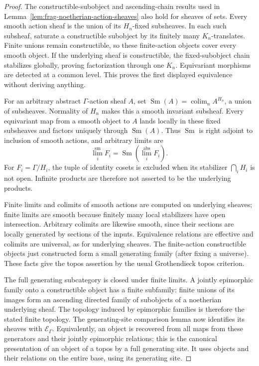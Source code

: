 \documentclass[11pt]{article}
\theoremstyle{definition}
\theoremstyle{remark}
\begin{document}
\begin{proof}
The constructible-subobject and ascending-chain results used in
Lemma~\ref{lem:frag-noetherian-action-sheaves} also hold for sheaves
of sets.  Every smooth action sheaf is the union of its $H_n$-fixed
subsheaves.  In each such subsheaf, saturate a constructible subobject
by its finitely many $K_n$-translates.  Finite unions remain
constructible, so these finite-action objects cover every smooth
object.  If the underlying sheaf is constructible, the fixed-subobject
chain stabilizes globally, proving factorization through one $K_n$.
Equivariant morphisms are detected at a common level.  This proves
the first displayed equivalence without deriving anything.

For an arbitrary abstract $\Gamma$-action sheaf $A$, set
$\operatorname{Sm}(A)=\operatorname*{colim}_n A^{H_n}$, a union of
subsheaves.  Normality of $H_n$ makes this a smooth invariant subsheaf.
Every equivariant map from a smooth object to $A$ lands locally in
these fixed subsheaves and factors uniquely through $\operatorname{Sm}(A)$.
Thus $\operatorname{Sm}$ is right adjoint to inclusion of smooth actions,
and arbitrary limits are
\[
 \lim_i^{\mathrm{sm}}F_i=\operatorname{Sm}(\lim_i^{\mathrm{abs}}F_i).
\]
For $F_i=\Gamma/H_i$, the tuple of identity cosets is excluded when
its stabilizer $\bigcap_iH_i$ is not open.  Infinite products are
therefore not asserted to be the underlying products.

Finite limits and colimits of smooth actions are computed on underlying
sheaves; finite limits are smooth because finitely many local
stabilizers have open intersection.  Arbitrary colimits are likewise
smooth, since their sections are locally generated by sections of the
inputs.  Equivalence relations are effective and colimits are
universal, as for underlying sheaves.  The finite-action constructible
objects just constructed form a small generating family (after fixing
a universe).  These facts give the topos assertion by the usual
Grothendieck topos criterion.

The full generating subcategory is closed under finite limits.  A
jointly epimorphic family onto a constructible object has a finite
subfamily: finite unions of its images form an ascending directed
family of subobjects of a noetherian underlying sheaf.  The topology
induced by epimorphic families is therefore the stated finite topology.
The generating-site comparison lemma now identifies its sheaves with
$\mathscr E_\Gamma$.  Equivalently, an object is recovered from all
maps from these generators and their jointly epimorphic relations;
this is the canonical presentation of an object of a topos by a full
generating site.  It uses objects and their relations on the entire
base, using its generating site.
\end{proof}
\end{document}
